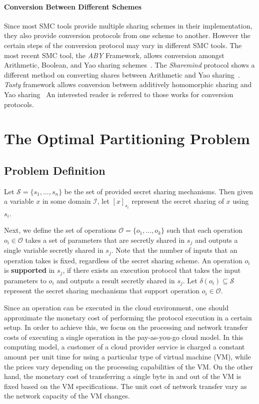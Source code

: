 \documentclass{llncs}
\begin{document}
\paragraph{Conversion Between Different Schemes} Since most SMC tools provide multiple sharing schemes in their implementation, they also provide conversion protocols from one scheme to another. However the certain steps of the conversion protocol may vary in different SMC tools. The most recent SMC tool, the \emph{ABY} Framework, allows conversion amongst Arithmetic, Boolean, and Yao sharing schemes~\cite{cite:demmler2015aby}. The \emph{Sharemind} protocol shows a different method on converting shares between Arithmetic and Yao sharing~\cite{cite:bogdanov2008sharemind}. \emph{Tasty} framework allows conversion between additively homomorphic sharing and Yao sharing~\cite{cite:henecka2010tasty} An interested reader is referred to those works for conversion protocols. 

\section{The Optimal Partitioning Problem}
\label{sec:problem}

\subsection{Problem Definition}
\label{sec:problem:definition}

Let $\mathcal{S}=\{s_1, \ldots, s_n\}$ be the set of provided secret sharing mechanisms. Then given a variable $x$ in some domain $\mathcal{I}$, let $[x]_{s_i}$ represent the secret sharing of $x$ using $s_i$. 

Next, we define the set of operations $\mathcal{O}=\{o_1, \ldots, o_k\}$ such that each operation $o_i\in\mathcal{O}$ takes a set of parameters that are secretly shared in $s_j$ and outputs a single variable secretly shared in $s_j$. Note that the number of inputs that an operation takes is fixed, regardless of the secret sharing scheme. An operation $o_i$ is \textbf{supported} in $s_j$, if there exists an execution protocol that takes the input parameters to $o_i$ and outputs a result secretly shared in $s_j$. Let $\delta(o_i)\subseteq \mathcal{S}$ represent the secret sharing mechanisms that support operation $o_i\in\mathcal{O}$. 

Since an operation can be executed in the cloud environment, one should approximate the monetary cost of performing the protocol execution in a certain setup. In order to achieve this, we focus on the processing and network transfer costs of executing a single operation in the pay-as-you-go cloud model. In this computing model, a customer of a cloud provider service is charged a constant amount per unit time for using a particular type of virtual machine (VM), while the prices vary depending on the processing capabilities of the VM. On the other hand, the monetary cost of transferring a single byte in and out of the VM is fixed based on the VM specifications. The unit cost of network transfer vary as the network capacity of the VM changes.
\end{document}
